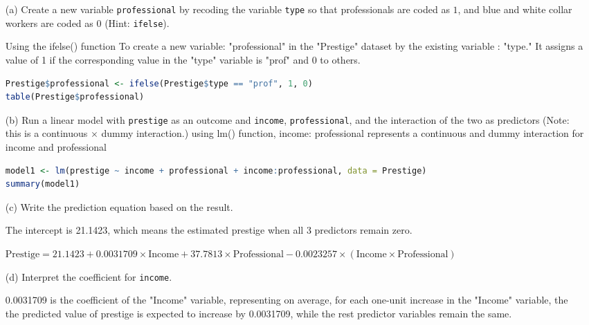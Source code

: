 \documentclass[12pt,letterpaper]{article}
\begin{document}
\newpage
\begin{enumerate}
	
	\item [(a)]
	Create a new variable \texttt{professional} by recoding the variable \texttt{type} so that professionals are coded as $1$, and blue and white collar workers are coded as $0$ (Hint: \texttt{ifelse}).

 
 Using  the ifelse() function To create a new variable:  "professional" in the "Prestige" dataset by  the existing variable : "type." It assigns a value of 1 if the corresponding value in the "type" variable is "prof" and 0 to others.

 \begin{lstlisting}[language=R] 
Prestige$professional <- ifelse(Prestige$type == "prof", 1, 0)
table(Prestige$professional)
 \end{lstlisting} 
	
	
	\item [(b)]
	Run a linear model with \texttt{prestige} as an outcome and \texttt{income}, \texttt{professional}, and the interaction of the two as predictors (Note: this is a continuous $\times$ dummy interaction.)
 using lm() function, income: professional represents a continuous and dummy interaction for income and  professional 
	 \begin{lstlisting}[language=R] 
model1 <- lm(prestige ~ income + professional + income:professional, data = Prestige)
summary(model1)
      \end{lstlisting} 


\newpage	
\item [(c)]
	Write the prediction equation based on the result.

 The intercept is  21.1423, which means the estimated prestige when all 3  predictors remain zero.  

 
	\(\text{Prestige} = 21.1423 + 0.0031709 \times \text{Income} + 37.7813 \times \text{Professional} - 0.0023257 \times (\text{Income} \times \text{Professional})\)
\vspace{2cm}	
	\item [(d)]
	Interpret the coefficient for \texttt{income}.
 
0.0031709 is the coefficient of the "Income" variable, representing  on average, for each one-unit increase in the "Income"  variable, the
the predicted value of prestige is expected to increase by 0.0031709, while the rest 
predictor variables remain the same.



\end{enumerate}
\end{document}
